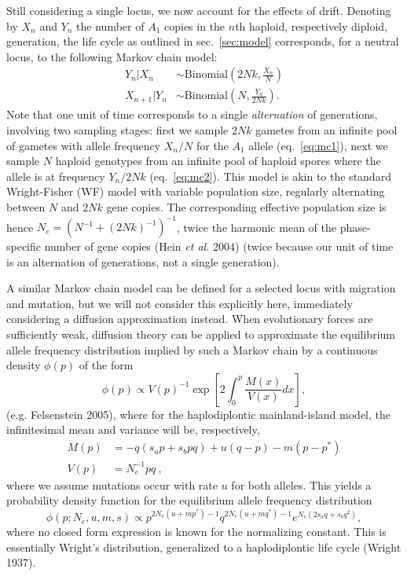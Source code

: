 \documentclass[
  11pt,
]{article}
\begin{document}
Still considering a single locus, we now account for the effects of
drift. Denoting by \(X_n\) and \(Y_n\) the number of \(A_1\) copies in
the \(n\)th haploid, respectively diploid, generation, the life cycle as
outlined in sec.~\ref{sec:model} corresponds, for a neutral locus, to
the following Markov chain model: \begin{align}
  Y_n|X_n &\sim \mathrm{Binomial}\left(2Nk, \frac{X_n}{N}\right) \label{eq:mc1} \\
  X_{n+1}|Y_n &\sim \mathrm{Binomial}\left(N, \frac{Y_n}{2Nk}\right). \label{eq:mc2}
  \end{align} Note that one unit of time corresponds to a single
\emph{alternation} of generations, involving two sampling stages: first
we sample \(2Nk\) gametes from an infinite pool of gametes with allele
frequency \(X_n/N\) for the \(A_1\) allele (eq.~\ref{eq:mc1}), next we
sample \(N\) haploid genotypes from an infinite pool of haploid spores
where the allele is at frequency \(Y_n/2Nk\) (eq.~\ref{eq:mc2}). This
model is akin to the standard Wright-Fisher (WF) model with variable
population size, regularly alternating between \(N\) and \(2Nk\) gene
copies. The corresponding effective population size is hence
\(N_e = (N^{-1} + (2Nk)^{-1})^{-1}\), twice the harmonic mean of the
phase-specific number of gene copies (Hein \emph{et al.} 2004) (twice
because our unit of time is an alternation of generations, not a single
generation).

A similar Markov chain model can be defined for a selected locus with
migration and mutation, but we will not consider this explicitly here,
immediately considering a diffusion approximation instead. When
evolutionary forces are sufficiently weak, diffusion theory can be
applied to approximate the equilibrium allele frequency distribution
implied by such a Markov chain by a continuous density \(\phi(p)\) of
the form \begin{equation*}
  \phi(p) \propto V(p)^{-1} \exp\left[2\int_0^p \frac{M(x)}{V(x)}dx\right],
\end{equation*} (e.g. Felsenstein 2005), where for the haplodiplontic
mainland-island model, the infinitesimal mean and variance will be,
respectively, \begin{align*}
  M(p) &= -q(s_ap + s_bpq) + u(q - p) - m(p - p^\ast) \\
  V(p) &= N_e^{-1} pq\ ,
  \end{align*} where we assume mutations occur with rate \(u\) for both
alleles. This yields a probability density function for the equilibrium
allele frequency distribution \begin{equation}
  \phi(p; N_e, u, m, s) \propto p^{2N_e(u+mp^\ast)-1}q^{2N_e(u+mq^\ast)-1}e^{N_e(2s_aq + s_bq^2)},
  \label{eq:phi}
  \end{equation} where no closed form expression is known for the
normalizing constant. This is essentially Wright's distribution,
generalized to a haplodiplontic life cycle (Wright 1937).
\end{document}

